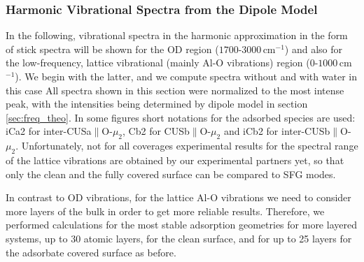 \documentclass[11pt,DIV=13,BCOR=5mm,a4paper,headinclude]{scrbook}
\newcommand\todo[1]{\textcolor{red}{TODO: \textit{{#1}}}}
\begin{document}
\subsubsection{Harmonic Vibrational Spectra from the Dipole Model}\label{phonons}

In the following, vibrational spectra in the harmonic approximation in the form of stick spectra will be shown for the OD region ($1700$-$3000\,$cm$^{-1}$) and also for the low-frequency, lattice vibrational (mainly Al-O vibrations) region ($0$-$1000\,$cm$^{-1}$).
We begin with the latter, and we compute spectra without and with water in this case
All spectra shown in this section were normalized to the most intense peak, with the intensities being determined by dipole model in section \ref{sec:freq_theo}.
In some figures short notations for the adsorbed species are used: iCa2 for inter-CUSa$\parallel$O-$\mu_2$, Cb2 for CUSb$\parallel$O-$\mu_2$ and iCb2 for inter-CUSb$\parallel$O-$\mu_2$.
Unfortunately, not for all coverages experimental results for the spectral range of the lattice vibrations are obtained by our experimental partners yet, so that only the clean and the fully covered surface can be compared to SFG modes.


In contrast to OD vibrations, for the lattice Al-O vibrations we need to consider more layers of the bulk in order to get more reliable results.
Therefore, we performed calculations for the most stable adsorption geometries for more layered systems, up to $30$ atomic layers, for the clean surface, and for up to 25 layers for the adsorbate covered surface as before.
\end{document}
